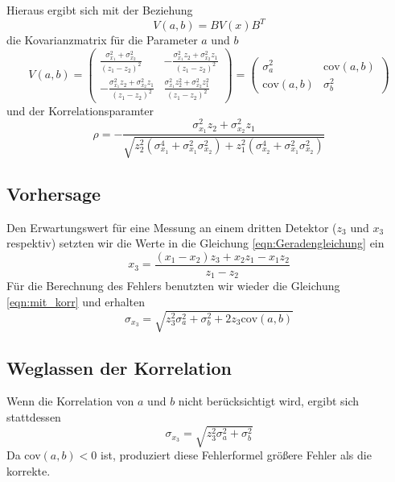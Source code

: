 Hieraus ergibt sich mit der Beziehung
\begin{equation}
    V(a,b)=BV(x)B^T
\end{equation}
die Kovarianzmatrix für die Parameter $a$ und $b$
\begin{equation}
    V(a,b)=
    \left(
        \begin{array}{rr}
            \frac{\sigma_{x_1}^2+\sigma_{x_2}^2}{(z_1-z_2)^2} & -\frac{\sigma_{x_1}^2z_2+\sigma_{x_2}^2z_1}{(z_1-z_2)^2} \\
            -\frac{\sigma_{x_1}^2z_2+\sigma_{x_2}^2z_1}{(z_1-z_2)^2} & \frac{\sigma_{x_1}^2z_2^2+\sigma_{x_2}^2z_1^2}{(z_1-z_2)^2}
        \end{array}
    \right)
    = 
    \left(
        \begin{array}{rr}
            \sigma_a^2 & \text{cov}(a,b)\\
            \text{cov}(a,b) & \sigma_b^2
        \end{array}
    \right)
\end{equation}
und der Korrelationsparamter
\begin{equation}
    \rho = -\frac{\sigma_{x_1}^2z_2+\sigma_{x_2}^2z_1}{\sqrt{z_2^2\left(\sigma_{x_1}^4+\sigma_{x_1}^2\sigma_{x_2}^2 \right) + z_1^2\left(\sigma_{x_2}^4+\sigma_{x_1}^2\sigma_{x_2}^2 \right)}}
\end{equation}

\subsection*{Vorhersage}
\label{sub:Vorhersage}
Den Erwartungswert für eine Messung an einem dritten Detektor ($z_3$ und $x_3$ respektiv) setzten wir die Werte in die Gleichung \eqref{eqn:Geradengleichung} ein
\begin{equation}
    x_3=\frac{(x_1-x_2)z_3+x_2 z_1 - x_1 z_2}{z_1-z_2}
\end{equation}
Für die Berechnung des Fehlers benutzten wir wieder die Gleichung \eqref{eqn:mit_korr} und erhalten
\begin{equation}
    \sigma_{x_3}=\sqrt{z_3^2\sigma_a^2+\sigma_b^2+2 z_3 \text{cov}(a,b)}
\end{equation}
\subsection*{Weglassen der Korrelation}
\label{sub:Weglassen der Korrelation}
Wenn die Korrelation von $a$ und $b$ nicht berücksichtigt wird, ergibt sich stattdessen
\begin{equation}
    \sigma_{x_3}=\sqrt{z_3^2\sigma_a^2+\sigma_b^2}
\end{equation}
Da cov$(a,b) < 0$ ist, produziert diese Fehlerformel größere Fehler als die korrekte.